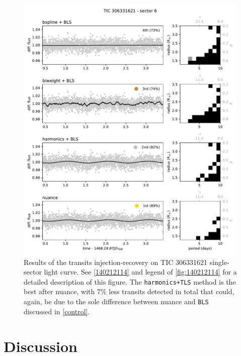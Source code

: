 \documentclass{aastex631}
\begin{document}
\begin{figure}[H]
    \begin{centering}
        \includegraphics[width=\linewidth]{306331621.pdf}
        \caption{Results of the transits injection-recovery on TIC 306331621 single-sector light curve. See \autoref{140212114} and legend of \autoref{fig:140212114} for a detailed description of this figure. The \texttt{harmonics+TLS} method is the best after \textsf{nuance}, with 7\% less transits detected in total that could, again, be due to the sole difference between \textsf{nuance} and \texttt{BLS} discussed in \autoref{control}.}
        \label{fig:306331621}
    \end{centering}
\end{figure}

\newpage
\section{Discussion}\label{perf}
\end{document}
